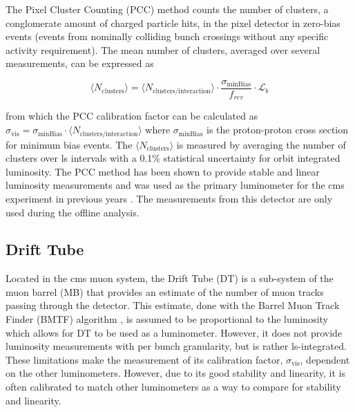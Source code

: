 The Pixel Cluster Counting (PCC) method counts the number of clusters, a conglomerate amount of charged particle hits, in the pixel detector in zero-bias events (events from nominally colliding bunch crossings without any specific activity requirement). The mean number of clusters, averaged over several measurements, can be expressed as

\begin{equation}
	\label{eq:pcc-clusters-mean}
	\langle N_{\text{clusters}} \rangle = \langle N_{\text{clusters} / \text{interaction}} \rangle \cdot \frac{\sigma_{\text{minBias}}}{f_{rev}} \cdot \mathcal{L}_b
\end{equation}

from which the PCC calibration factor can be calculated as $\sigma_{\text{vis}} = \sigma_{\text{minBias}} \cdot \langle N_{\text{clusters} / \text{interaction}} \rangle$ where $\sigma_{\text{minBias}}$ is the proton-proton cross section for minimum bias events. The $\langle N_{\text{clusters}} \rangle$ is measured by averaging the number of clusters over \acrshort{ls} intervals with a 0.1\% statistical uncertainty for orbit integrated luminosity. The PCC method has been shown to provide stable and linear luminosity measurements and was used as the primary luminometer for the \acrshort{cms} experiment in previous years \cite{Sirunyan:2759951}. The measurements from this detector are only used during the offline analysis. 

\subsection{Drift Tube}
\label{subsec:dt}

Located in the \acrshort{cms} muon system, the Drift Tube (DT) is a sub-system of the muon barrel (MB) that provides an estimate of the number of muon tracks passing through the detector. This estimate, done with the Barrel Muon Track Finder (BMTF) algorithm \cite{Triossi_2017}, is assumed to be proportional to the luminosity which allows for DT to be used as a luminometer. However, it does not provide luminosity measurements with per bunch granularity, but is rather \acrshort{ls}-integrated. These limitations make the measurement of its calibration factor, $\sigma_{\text{vis}}$, dependent on the other luminometers. However, due to its good stability and linearity, it is often calibrated to match other luminometers as a way to compare for stability and linearity.

